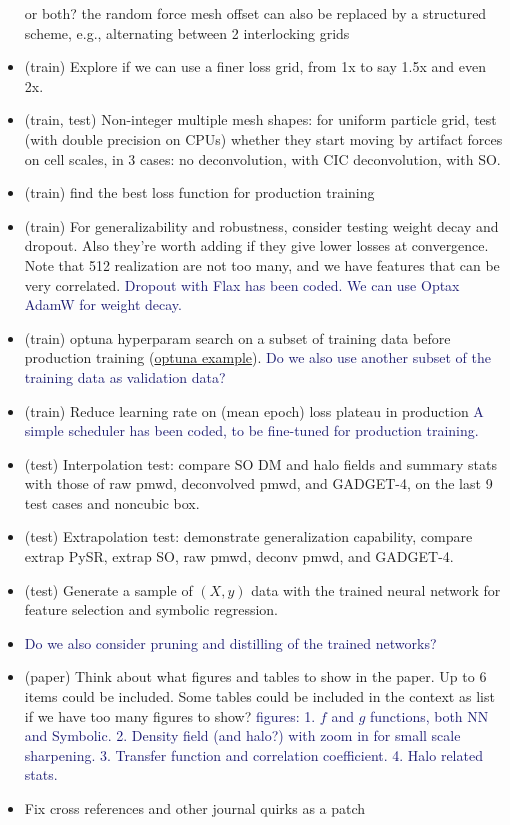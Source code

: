 \documentclass[modern, trackchanges, dvipsnames]{aastex631}
\newcommand{\GADGET}{{{\fontsize{10pt}{12pt}\selectfont GADGET}-4}}
\newcommand{\YZ}[1]{\textcolor{MidnightBlue}{#1}}
\begin{document}
\begin{itemize}
  or both? the random force mesh offset can also be replaced by a
  structured scheme, e.g., alternating between 2 interlocking grids
\item (train) Explore if we can use a finer loss grid, from 1x to say
  1.5x and even 2x.
\item (train, test) Non-integer multiple mesh shapes: for uniform
  particle grid, test (with double precision on CPUs) whether they start
  moving by artifact forces on cell scales, in 3 cases: no
  deconvolution, with CIC deconvolution, with SO.
\item (train) find the best loss function for production training
\item (train) For generalizability and robustness, consider testing
  weight decay and dropout. Also they're worth adding if they give lower
  losses at convergence. Note that 512 realization are not too many, and
  we have features that can be very correlated.\newline
  \YZ{Dropout with Flax has been coded. We can use Optax AdamW for weight decay.}
\item (train) optuna hyperparam search on a subset of training data
  before production training
  (\href{https://github.com/optuna/optuna-examples/blob/main/haiku/haiku_simple.py}{optuna
  example}).\newline
  \YZ{Do we also use another subset of the training data as validation data?}
\item (train) Reduce learning rate on (mean epoch) loss plateau in
  production\newline
  \YZ{A simple scheduler has been coded, to be fine-tuned for production training.}
\item (test) Interpolation test: compare SO DM and halo fields and
  summary stats with those of raw pmwd, deconvolved pmwd, and \GADGET,
  on the last 9 test cases and noncubic box.
\item (test) Extrapolation test: demonstrate generalization capability,
  compare extrap PySR, extrap SO, raw pmwd, deconv pmwd, and \GADGET.
\item (test) Generate a sample of $(X, y)$ data with the trained neural network
  for feature selection and symbolic regression.
\item \YZ{Do we also consider pruning and distilling of the trained networks?}
\item (paper) Think about what figures and tables to show in the paper. Up
to 6 items could be included. Some tables could be included in the context as
list if we have too many figures to show?\newline
  \YZ{figures:
  1. $f$ and $g$ functions, both NN and Symbolic.
  2. Density field (and halo?) with zoom in for small scale sharpening.
  3. Transfer function and correlation coefficient.
  4. Halo related stats.}
\item Fix cross references and other journal quirks as a patch
\end{itemize}
\end{document}
